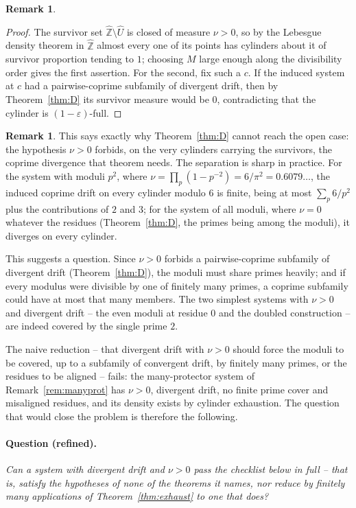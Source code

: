 \documentclass[11pt]{article}
\theoremstyle{plain}
\theoremstyle{definition}
\newtheorem{remark}[theorem]{Remark}
\newcommand{\Zhat}{\widehat{\mathbb{Z}}}
\newcommand{\cU}{\widehat{U}}
\begin{document}
\begin{remark}
\begin{proof}
The survivor set $\Zhat\setminus\cU$ is closed of measure
$\nu>0$, so by the Lebesgue density theorem in $\Zhat$ almost
every one of its points has cylinders about it of survivor
proportion tending to $1$; choosing $M$ large enough along the
divisibility order gives the first assertion.  For the second,
fix such a $c$.  If the induced system at $c$ had a
pairwise-coprime subfamily of divergent drift, then by
Theorem~\ref{thm:D} its survivor measure would be $0$,
contradicting that the cylinder is $(1-\varepsilon)$-full.
\end{proof}

\begin{remark}
This says exactly why Theorem~\ref{thm:D} cannot reach the open
case: the hypothesis $\nu>0$ forbids, on the very cylinders
carrying the survivors, the coprime divergence that theorem
needs.  The separation is sharp in practice.  For the system with moduli $p^2$, where
$\nu=\prod_p(1-p^{-2})=6/\pi^2=0.6079\ldots$, the induced coprime
drift on every cylinder modulo $6$ is finite, being at most
$\sum_p6/p^2$ plus the contributions of $2$ and $3$; for the
system of all moduli, where $\nu=0$ whatever the residues
(Theorem~\ref{thm:D}, the primes being among the moduli), it
diverges on every cylinder.
\end{remark}

This suggests a question.  Since $\nu>0$
forbids a pairwise-coprime subfamily of divergent drift
(Theorem~\ref{thm:D}), the moduli must share primes heavily; and
if every modulus were divisible by one of finitely many primes,
a coprime subfamily could have at most that many members.  The two
simplest systems with $\nu>0$ and divergent drift -- the even
moduli at residue $0$ and the doubled construction -- are indeed
covered by the single prime $2$.

The naive reduction -- that divergent drift with $\nu>0$ should
force the moduli to be covered, up to a subfamily of convergent
drift, by finitely many primes, or the residues to be aligned --
fails: the many-protector system of Remark~\ref{rem:manyprot}
has $\nu>0$, divergent drift, no finite
prime cover and misaligned residues, and its density exists by
cylinder exhaustion.  The question that would close the problem
is therefore the following.

\paragraph{Question (refined).}
\emph{Can a system with divergent drift and $\nu>0$ pass the
checklist below in full -- that is, satisfy the hypotheses of
none of the theorems it names, nor reduce by finitely many
applications of Theorem~\ref{thm:exhaust} to one that does?}


\end{remark}
\end{document}
